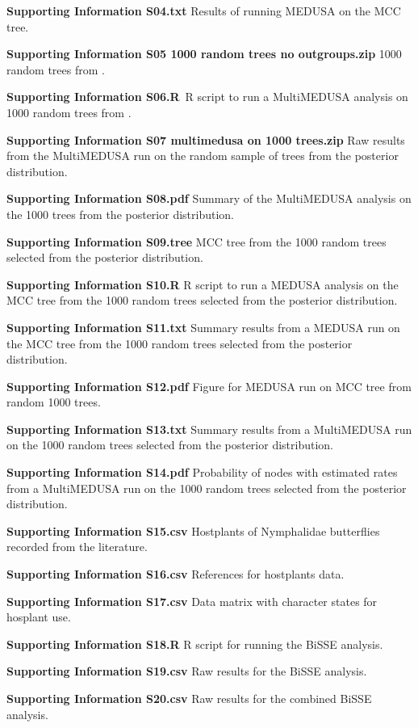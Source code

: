 \documentclass[10pt]{article}
\begin{document}
{\textbf{Supporting Information S04.txt}} Results of running MEDUSA on
the MCC tree.

{\textbf{Supporting Information S05 1000 random trees no outgroups.zip}}
1000 random trees from \cite{wahlberg2009}.

{\textbf{Supporting Information S06.R}}~R script to run a MultiMEDUSA
analysis on 1000 random trees from \cite{wahlberg2009}.

{\textbf{Supporting Information S07 multimedusa on 1000 trees.zip}} Raw
results from the MultiMEDUSA run on the random sample of trees from the
posterior distribution.

{\textbf{Supporting Information S08.pdf}} Summary of the MultiMEDUSA
analysis on the 1000 trees from the posterior distribution.

{\textbf{Supporting Information S09.tree}} MCC tree from the 1000 random
trees selected from the posterior distribution.

{\textbf{Supporting Information S10.R}} R script to run a MEDUSA
analysis on the MCC tree from the 1000 random trees selected from the
posterior distribution.

{\textbf{Supporting Information S11.txt}} Summary results from a MEDUSA
run on the MCC tree from the 1000 random trees selected from the
posterior distribution.

{\textbf{Supporting Information S12.pdf}} Figure for MEDUSA run on MCC
tree from random 1000 trees.

{\textbf{Supporting Information S13.txt}} Summary results from a
MultiMEDUSA run on the 1000 random trees selected from the posterior
distribution.

{\textbf{Supporting Information S14.pdf}} Probability of nodes with
estimated rates from a MultiMEDUSA run on the 1000 random trees selected
from the posterior distribution.

{\textbf{Supporting Information S15.csv}} Hostplants of Nymphalidae
butterflies recorded from the literature.

{\textbf{Supporting Information S16.csv}} References for hostplants
data.

{\textbf{Supporting Information S17.csv}} Data matrix with character
states for hosplant use.

{\textbf{Supporting Information S18.R}} R script for running the BiSSE
analysis.

{\textbf{Supporting Information S19.csv}} Raw results for the BiSSE
analysis.

{\textbf{Supporting Information S20.csv}} Raw results for the combined
BiSSE analysis.
\end{document}

